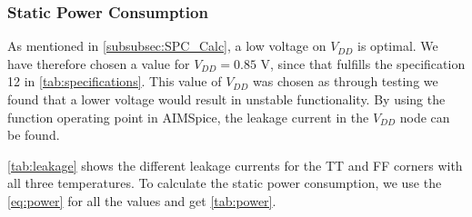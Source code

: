 \subsubsection{Static Power Consumption}

As mentioned in \autoref{subsubsec:SPC_Calc}, a low voltage on $V_{DD}$ is optimal. We have therefore chosen a value for $V_{DD} = 0.85$ V, since that fulfills the specification 12 in \autoref{tab:specifications}. This value of $V_{DD}$ was chosen as through testing we found that a lower voltage would result in unstable functionality. By using the function operating point in AIMSpice, the leakage current in the $V_{DD}$ node can be found.

\autoref{tab:leakage} shows the different leakage currents for the TT and FF corners with all three temperatures. To calculate the static power consumption, we use the \autoref{eq:power} for all the values and get  \autoref{tab:power}.

\begin{table}[H]
\centering
\caption{Leakage Current.}
\label{tab:leakage}
\end{table}

\begin{table}[H]
\centering
\caption{Static Power Consumption.}
\label{tab:power}
\end{table}

